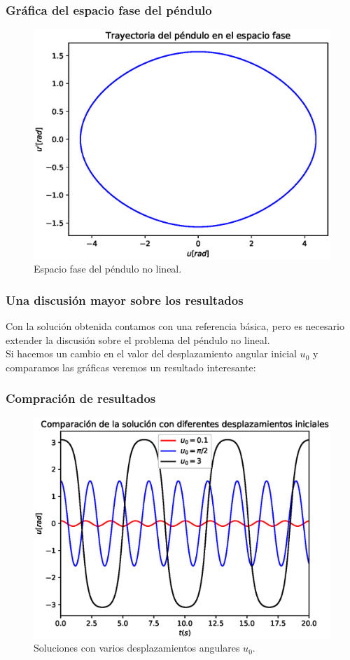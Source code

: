 \begin{frame}
\frametitle{Gráfica del espacio fase del péndulo}
\begin{figure}[h!]
    \centering
    \includegraphics[scale=0.5]{Imagenes/metodo_RK4_pendulo_02.eps}
    \caption{Espacio fase del péndulo no lineal.}
    \label{fig_figura_12_pendulo02}
\end{figure}
\end{frame}
\begin{frame}
\frametitle{Una discusión mayor sobre los resultados}
Con la solución obtenida contamos con una referencia básica, pero es necesario extender la discusión sobre el problema del péndulo no lineal.
\\
\bigskip
Si hacemos un cambio en el valor del desplazamiento angular inicial $u_{0}$ y comparamos las gráficas veremos un resultado interesante:
\end{frame}
\begin{frame}
\frametitle{Compración de resultados}
\begin{figure}[h!]
    \centering
    \includegraphics[scale=0.5]{Imagenes/metodo_RK4_pendulo_03.eps}
    \caption{Soluciones con varios desplazamientos angulares $u_{0}$.}
    \label{fig_figura_12_pendulo03}
\end{figure}
\end{frame}

